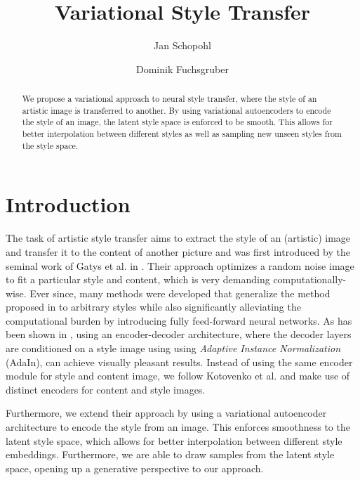 \documentclass[10pt,twocolumn,letterpaper]{article}
\begin{document}
\title{Variational Style Transfer}

\author{
Jan Schopohl
\and
Dominik Fuchsgruber
}

\maketitle

\begin{abstract}
   We propose a variational approach to neural style transfer, where the style of an artistic image is transferred to another. By using variational autoencoders to encode the style of an image, the latent style space is enforced to be smooth. This allows for better interpolation between different styles as well as sampling new unseen styles from the style space.
\end{abstract}

\section{Introduction}

The task of artistic style transfer aims to extract the style of an (artistic) image and transfer it to the content of another picture and was first introduced by the seminal work of Gatys et al. in \cite{gatys}. Their approach optimizes a random noise image to fit a particular style and content, which is very demanding computationally-wise. Ever since, many methods were developed that generalize the method proposed in \cite{gatys} to arbitrary styles while also significantly alleviating the computational burden by introducing fully feed-forward neural networks. As has been shown in \cite{adain}, using an encoder-decoder architecture, where the decoder layers are conditioned on a style image using using \textit{Adaptive Instance Normalization} (AdaIn), can achieve visually pleasant results. Instead of using the same encoder module for style and content image, we follow Kotovenko et al. \cite{disentanglement} and make use of distinct encoders for content and style images.

Furthermore, we extend their approach by using a variational autoencoder architecture \cite{vae} to encode the style from an image. This enforces smoothness to the latent style space, which allows for better interpolation between different style embeddings. Furthermore, we are able to draw samples from the latent style space, opening up a generative perspective to our approach.
\end{document}
